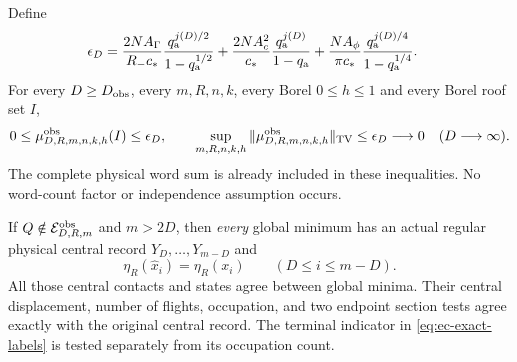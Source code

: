 \begin{theorem}
\label{thm:ec-uniform-source}
Define
\begin{align}\label{eq:ec-source-bound}
 \epsilon_D={}&
 \frac{2NA_\Gamma}{R_-c_*}
       \frac{q_{\rm a}^{j(D)/2}}{1-q_{\rm a}^{1/2}}
 +\frac{2NA_c^2}{c_*}
       \frac{q_{\rm a}^{j(D)}}{1-q_{\rm a}}
 +\frac{NA_\phi}{\pi c_*}
       \frac{q_{\rm a}^{j(D)/4}}{1-q_{\rm a}^{1/4}} .
\end{align}
For every $D\ge D_{\rm obs}$, every $m,R,n,k$, every Borel
$0\le h\le1$ and every Borel roof set $I$,
\begin{equation}\label{eq:ec-positive-source}
 0\le\mu^{\rm obs}_{D,R,m,n,k,h}(I)\le\epsilon_D,\qquad
 \sup_{m,R,n,k,h}\|\mu^{\rm obs}_{D,R,m,n,k,h}\|_{\rm TV}
                               \le\epsilon_D\longrightarrow0
                          \quad(D\longrightarrow\infty).
\end{equation}
The complete physical word sum is already included in these
inequalities.  No word-count factor or independence assumption occurs.

If $Q\notin\mathcal E^{\rm obs}_{D,R,m}$ and $m>2D$, then
\emph{every} global minimum has an actual regular physical central
record $Y_D,\ldots,Y_{m-D}$ and
\begin{equation}\label{eq:ec-exact-labels}
 \eta_R(\widehat x_i)=\eta_R(x_i)
                         \qquad(D\le i\le m-D).
\end{equation}
All those central contacts and states agree between global minima.
Their central displacement, number of flights, occupation, and two
endpoint section tests agree exactly with the original central
record.  The terminal indicator in \eqref{eq:ec-exact-labels} is
tested separately from its occupation count.
\end{theorem}
